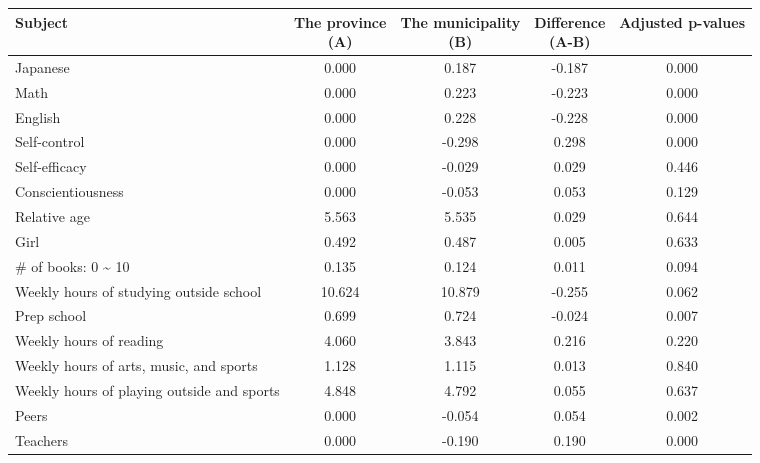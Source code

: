 \begin{tabular}{lcccc}
\hline \hline 
Subject & \shortstack{The province\\(A)} & \shortstack{The municipality\\(B)} & \shortstack{Difference\\(A-B)} & Adjusted p-values \\
\hline 
Japanese & 0.000 & 0.187 & -0.187 & 0.000 \\
Math & 0.000 & 0.223 & -0.223 & 0.000 \\
English & 0.000 & 0.228 & -0.228 & 0.000 \\
Self-control & 0.000 & -0.298 & 0.298 & 0.000 \\
Self-efficacy & 0.000 & -0.029 & 0.029 & 0.446 \\
Conscientiousness & 0.000 & -0.053 & 0.053 & 0.129 \\
Relative age & 5.563 & 5.535 & 0.029 & 0.644 \\
Girl & 0.492 & 0.487 & 0.005 & 0.633 \\
\# of books: 0 \textasciitilde{} 10 & 0.135 & 0.124 & 0.011 & 0.094 \\
Weekly hours of studying outside school & 10.624 & 10.879 & -0.255 & 0.062 \\
Prep school & 0.699 & 0.724 & -0.024 & 0.007 \\
Weekly hours of reading & 4.060 & 3.843 & 0.216 & 0.220 \\
Weekly hours of arts, music, and sports & 1.128 & 1.115 & 0.013 & 0.840 \\
Weekly hours of playing outside and sports & 4.848 & 4.792 & 0.055 & 0.637 \\
Peers & 0.000 & -0.054 & 0.054 & 0.002 \\
Teachers & 0.000 & -0.190 & 0.190 & 0.000 \\
\hline \hline 
\end{tabular}